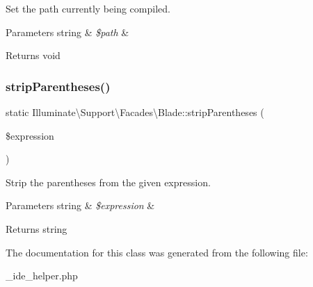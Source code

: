 Set the path currently being compiled.


\begin{DoxyParams}[1]{Parameters}
string & {\em \$path} & \\
\hline
\end{DoxyParams}
\begin{DoxyReturn}{Returns}
void 
\end{DoxyReturn}
\mbox{\label{class_illuminate_1_1_support_1_1_facades_1_1_blade_ac29fff878c323d136f3d9aa334adf9e6}} 
\subsubsection{\texorpdfstring{strip\+Parentheses()}{stripParentheses()}}
{\footnotesize\ttfamily static Illuminate\textbackslash{}\+Support\textbackslash{}\+Facades\textbackslash{}\+Blade\+::strip\+Parentheses (\begin{DoxyParamCaption}\item[{}]{\$expression }\end{DoxyParamCaption})\hspace{0.3cm}{\ttfamily [static]}}

Strip the parentheses from the given expression.


\begin{DoxyParams}[1]{Parameters}
string & {\em \$expression} & \\
\hline
\end{DoxyParams}
\begin{DoxyReturn}{Returns}
string 
\end{DoxyReturn}


The documentation for this class was generated from the following file\+:\begin{DoxyCompactItemize}
\item 
\+\_\+ide\+\_\+helper.\+php\end{DoxyCompactItemize}
